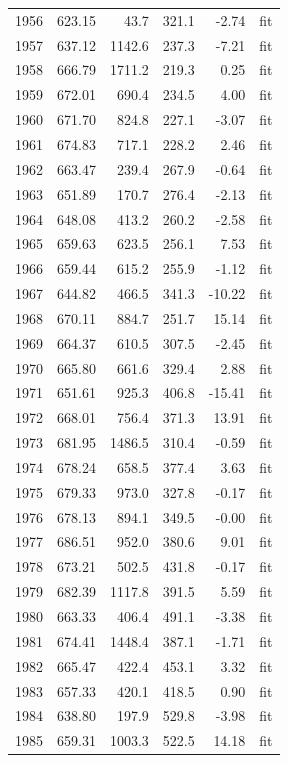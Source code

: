 \documentclass[11pt,a4paper]{article}
\begin{document}
\begin{longtable}{rrrrrl}
1956 & 623.15 & 43.7 & 321.1 & -2.74 & fit \\
1957 & 637.12 & 1142.6 & 237.3 & -7.21 & fit \\
1958 & 666.79 & 1711.2 & 219.3 & 0.25 & fit \\
1959 & 672.01 & 690.4 & 234.5 & 4.00 & fit \\
1960 & 671.70 & 824.8 & 227.1 & -3.07 & fit \\
1961 & 674.83 & 717.1 & 228.2 & 2.46 & fit \\
1962 & 663.47 & 239.4 & 267.9 & -0.64 & fit \\
1963 & 651.89 & 170.7 & 276.4 & -2.13 & fit \\
1964 & 648.08 & 413.2 & 260.2 & -2.58 & fit \\
1965 & 659.63 & 623.5 & 256.1 & 7.53 & fit \\
1966 & 659.44 & 615.2 & 255.9 & -1.12 & fit \\
1967 & 644.82 & 466.5 & 341.3 & -10.22 & fit \\
1968 & 670.11 & 884.7 & 251.7 & 15.14 & fit \\
1969 & 664.37 & 610.5 & 307.5 & -2.45 & fit \\
1970 & 665.80 & 661.6 & 329.4 & 2.88 & fit \\
1971 & 651.61 & 925.3 & 406.8 & -15.41 & fit \\
1972 & 668.01 & 756.4 & 371.3 & 13.91 & fit \\
1973 & 681.95 & 1486.5 & 310.4 & -0.59 & fit \\
1974 & 678.24 & 658.5 & 377.4 & 3.63 & fit \\
1975 & 679.33 & 973.0 & 327.8 & -0.17 & fit \\
1976 & 678.13 & 894.1 & 349.5 & -0.00 & fit \\
1977 & 686.51 & 952.0 & 380.6 & 9.01 & fit \\
1978 & 673.21 & 502.5 & 431.8 & -0.17 & fit \\
1979 & 682.39 & 1117.8 & 391.5 & 5.59 & fit \\
1980 & 663.33 & 406.4 & 491.1 & -3.38 & fit \\
1981 & 674.41 & 1448.4 & 387.1 & -1.71 & fit \\
1982 & 665.47 & 422.4 & 453.1 & 3.32 & fit \\
1983 & 657.33 & 420.1 & 418.5 & 0.90 & fit \\
1984 & 638.80 & 197.9 & 529.8 & -3.98 & fit \\
1985 & 659.31 & 1003.3 & 522.5 & 14.18 & fit \\

\end{longtable}
\end{document}
